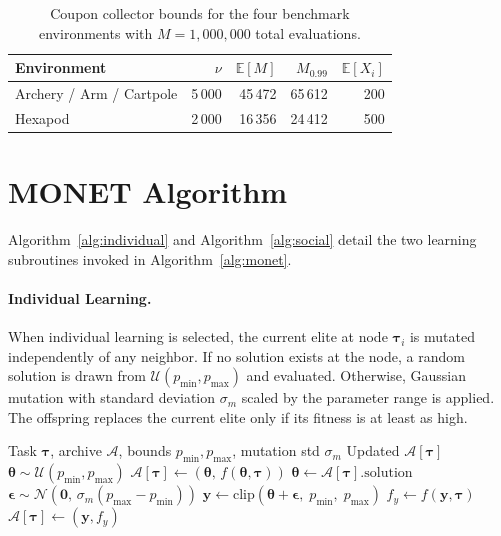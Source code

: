 \begin{table}[h]
\centering
\caption{Coupon collector bounds for the four benchmark environments with $M=1{,}000{,}000$ total evaluations.}
\label{tab:coupon-collector}
\begin{tabular}{@{}lrrrr@{}}
\toprule
Environment & $\nu$ & $\mathbb{E}[M]$ & $M_{0.99}$ & $\mathbb{E}[X_i]$ \\
\midrule
Archery / Arm / Cartpole & 5\,000 & 45\,472 & 65\,612 & 200 \\
Hexapod              & 2\,000 & 16\,356 & 24\,412 & 500 \\
\bottomrule
\end{tabular}
\end{table}


\section{MONET Algorithm}
Algorithm~\ref{alg:individual} and Algorithm~\ref{alg:social} detail the two learning subroutines invoked in Algorithm~\ref{alg:monet}.

\paragraph{Individual Learning.}
When individual learning is selected, the current elite at node $\boldsymbol{\tau}_i$ is mutated independently of any neighbor. If no solution exists at the node, a random solution is drawn from $\mathcal{U}(p_{\min}, p_{\max})$ and evaluated. Otherwise, Gaussian mutation with standard deviation $\sigma_m$ scaled by the parameter range is applied. The offspring replaces the current elite only if its fitness is at least as high.

\begin{algorithm}[H]
\caption{Individual Learning}\label{alg:individual}
\begin{algorithmic}[1]
\Require Task $\boldsymbol{\tau}$, archive $\mathcal{A}$, bounds $p_{\min}, p_{\max}$, mutation std $\sigma_m$
\Ensure Updated $\mathcal{A}[\boldsymbol{\tau}]$
 
    \State $\boldsymbol{\theta} \sim \mathcal{U}(p_{\min}, p_{\max})$ 
    \State $\mathcal{A}[\boldsymbol{\tau}] \gets (\boldsymbol{\theta},\, f(\boldsymbol{\theta}, \boldsymbol{\tau}))$
    \State \Return
\EndIf
\State $\boldsymbol{\theta} \gets \mathcal{A}[\boldsymbol{\tau}].\text{solution}$ 
\State $\boldsymbol{\epsilon} \sim \mathcal{N}(\mathbf{0},\, \sigma_m (p_{\max} - p_{\min}))$ 
\State $\mathbf{y} \gets \text{clip}(\boldsymbol{\theta} + \boldsymbol{\epsilon},\; p_{\min},\; p_{\max})$ 
\State $f_y \gets f(\mathbf{y}, \boldsymbol{\tau})$
 
    \State $\mathcal{A}[\boldsymbol{\tau}] \gets (\mathbf{y}, f_y)$
\EndIf
\end{algorithmic}
\end{algorithm}

